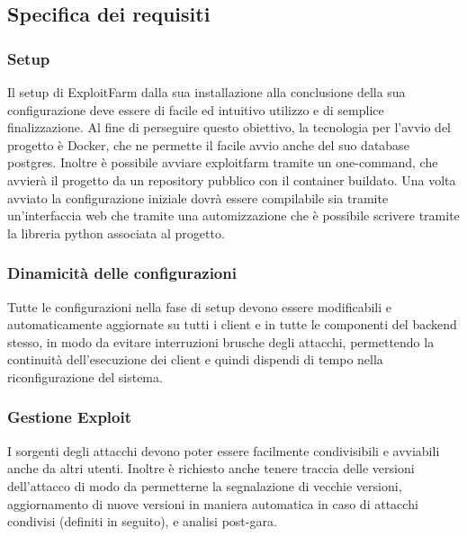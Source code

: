 \documentclass[11pt]{article}
\begin{document}
\subsection{Specifica dei requisiti}
\subsubsection{Setup}
Il setup di ExploitFarm dalla sua installazione alla conclusione della sua configurazione deve essere di facile ed intuitivo utilizzo e di semplice finalizzazione. Al fine di perseguire questo obiettivo, la tecnologia per l'avvio del progetto è Docker, che ne permette il facile avvio anche del suo database postgres. Inoltre è possibile avviare exploitfarm tramite un one-command, che avvierà il progetto da un repository pubblico con il container buildato. Una volta avviato la configurazione iniziale dovrà essere compilabile sia tramite un'interfaccia web che tramite una automizzazione che è possibile scrivere tramite la libreria python associata al progetto.
\subsubsection{Dinamicità delle configurazioni}
Tutte le configurazioni nella fase di setup devono essere modificabili e automaticamente aggiornate su tutti i client e in tutte le componenti del backend stesso, in modo da evitare interruzioni brusche degli attacchi, permettendo la continuità dell'esecuzione dei client e quindi dispendi di tempo nella riconfigurazione del sistema.
\subsubsection{Gestione Exploit}
I sorgenti degli attacchi devono poter essere facilmente condivisibili e avviabili anche da altri utenti. Inoltre è richiesto anche tenere traccia delle versioni dell'attacco di modo da permetterne la segnalazione di vecchie versioni, aggiornamento di nuove versioni in maniera automatica in caso di attacchi condivisi (definiti in seguito), e analisi post-gara.
\end{document}
